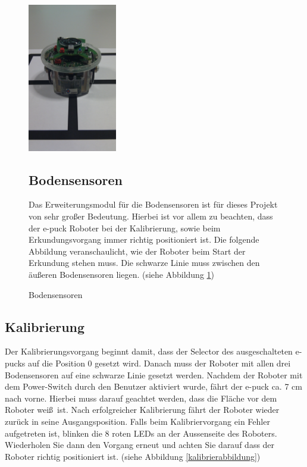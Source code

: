 \documentclass[10pt,a4paper]{article}
\begin{document}
    \begin{figure}[htbp]
		\begin{minipage}[t]{6.5cm}
			\vspace{0pt}
			\includegraphics[height=6.5cm]{images/puck2.png} 
			\caption{Bodensensoren}
			\label{positionierung_epuck}
		\end{minipage}
		\hfill
		\begin{minipage}[t]{0.5\textwidth}
			\vspace{10pt}
				\subsection{Bodensensoren}
						Das Erweiterungsmodul f\"ur die Bodensensoren ist f\"ur dieses Projekt von sehr gro\ss er Bedeutung. Hierbei ist vor allem zu beachten, dass der e-puck 								Roboter	bei der Kalibrierung, sowie beim Erkundungsvorgang immer richtig positioniert ist. Die folgende Abbildung veranschaulicht, wie der Roboter 
						beim Start der Erkundung	stehen muss. Die schwarze Linie muss zwischen den \"au\ss eren Bodensensoren liegen. (siehe Abbildung 				
						\ref{positionierung_epuck})
		\end{minipage}
   \end{figure}
   
\newpage

	\subsection{Kalibrierung}
		Der Kalibrierungsvorgang beginnt damit, dass der Selector des ausgeschalteten e-pucks auf die Position 0 gesetzt wird. Danach muss der Roboter mit allen drei
		Bodensensoren auf eine schwarze Linie gesetzt werden. Nachdem der Roboter mit dem Power-Switch durch den Benutzer aktiviert wurde, f\"ahrt der e-puck ca.
		7 cm nach vorne. Hierbei muss darauf geachtet werden, dass die Fl\"ache vor dem Roboter wei\ss \ ist. Nach erfolgreicher Kalibrierung f\"ahrt der Roboter wieder
		zur\"uck in seine Ausgangsposition. Falls beim Kalibriervorgang ein Fehler aufgetreten ist, blinken die 8 roten LEDs an der Aussenseite des Roboters. 
		Wiederholen Sie dann den Vorgang erneut und achten Sie darauf dass der Roboter richtig positioniert ist. (siehe Abbildung \ref{kalibrierabbildung}) \\
		
\end{document}
